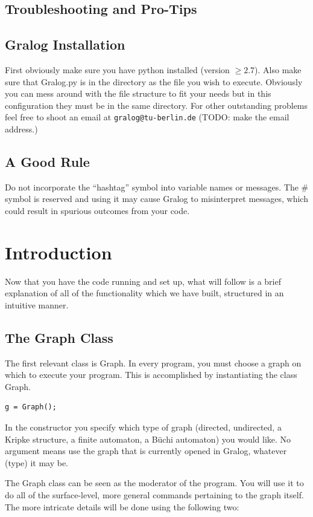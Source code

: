 \subsection{Troubleshooting and Pro-Tips}
\subsection{Gralog Installation}
First obviously make sure you have python installed (version $\ge
2.7$). Also make sure that Gralog.py is in the directory as the file you
wish to execute. Obviously you can mess around with the file structure
to fit your needs but in this configuration they must be in the same
directory. For other outstanding problems feel free to shoot an email
at \texttt{gralog@tu-berlin.de} (TODO: make the email address.)

\subsection{A Good Rule}
Do not incorporate the "`hashtag"' symbol into variable names or messages. The \# symbol is reserved and using it may cause Gralog to misinterpret messages, which could result in spurious outcomes from your code.

\section{Introduction}
Now that you have the code running and set up, what will follow is a brief explanation of all of the functionality which we have built, structured in an intuitive manner.

\subsection{The Graph Class}
The first relevant class is Graph. In every program, you must choose a graph on which to execute your program. This is accomplished by instantiating the class Graph. 

\begin{lstlisting}
g = Graph();
\end{lstlisting}

In the constructor you specify which type of graph (directed,
undirected, a Kripke structure, a finite automaton, a Büchi automaton) you would like. No
argument means use the graph that is currently opened in Gralog, whatever (type) it may be.

The Graph class can be seen as the moderator of the program. You will use it to do all of the surface-level, more general commands pertaining to the graph itself. The more intricate details will be done using the following two:

